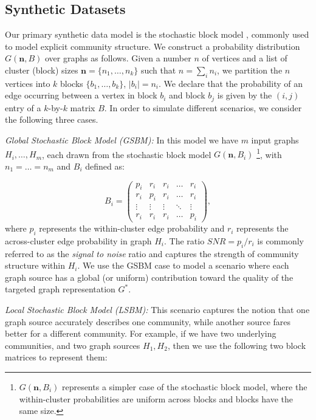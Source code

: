\documentclass{article}
\begin{document}
\subsection{Synthetic Datasets}
\label{sec:synthetic-model}

Our primary synthetic data model is the stochastic block model \cite{Wang87},
commonly used to model explicit community structure.  We construct a
probability distribution $G(\mathbf{n},B)$ over graphs as follows. Given a
number $n$ of vertices and a list of cluster (block) sizes $\mathbf{n}=\{n_1,
\dots, n_k\}$ such that $n =\sum_i n_i$, we partition the $n$ vertices into $k$
blocks $\{b_1, \dots, b_k\}$, $|b_i|=n_i$.  We declare that the probability of
an edge occurring between a vertex in block $b_i$ and block $b_j$ is given by
the $(i,j)$ entry of a $k$-by-$k$ matrix $B$. In order to simulate different
scenarios, we consider the following three cases.
 
{\em Global Stochastic Block Model (GSBM):} In this model we have $m$ input
graphs ${H_i,\ldots,H_m}$, each drawn from the stochastic block model
$G(\mathbf{n}, B_i)$ \footnote{$G(\mathbf{n}, B_i)$ represents a simpler case
of the stochastic block model, where the within-cluster probabilities are
uniform across blocks and blocks have the same size.}, with $n_1 = \dots = n_m$
and $B_i$ defined as:

\[
   B_i = 
   \begin{pmatrix}  
      p_i        &  r_i        &  r_i        & \dots  &  r_i\\
      r_i        &  p_i        &  r_i        & \dots  &  r_i \\
      \vdots     & \vdots      & \vdots      & \ddots &  \vdots      \\
      r_i        &  r_i        & r_i         & \dots  &  p_i
   \end{pmatrix},
\]
where $p_i$ represents the within-cluster edge probability and $r_i$ represents
the across-cluster edge probability in graph $H_i$. The ratio $SNR=p_i/r_i$ is
commonly referred to as the {\em signal to noise} ratio and captures the
strength of community structure within $H_i$. We use the GSBM case to model a
scenario where each graph source has a global (or uniform) contribution toward
the quality of the targeted graph representation $G^*$.

{\em Local Stochastic Block Model (LSBM):} This scenario captures the notion
that one graph source accurately describes one community, while another source
fares better for a different community. For example, if we have two underlying
communities, and two graph sources $H_1, H_2$, then we use the following two
block matrices to represent them:
\end{document}
